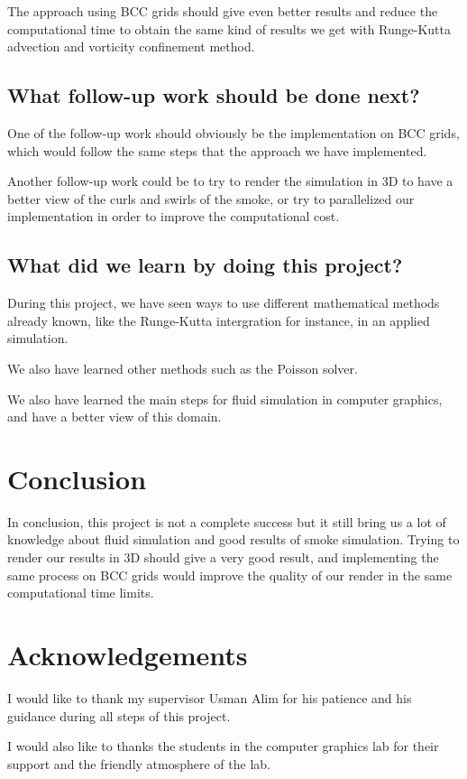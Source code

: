 \documentclass[accepted,single]{gipaper}
\begin{document}
The approach using BCC grids should give even better results and reduce the computational time to obtain the same kind of results we get with Runge-Kutta advection and vorticity confinement method.

\subsection{What follow-up work should be done next?}

One of the follow-up work should obviously be the implementation on BCC grids, which would follow the same steps that the approach we have implemented.

Another follow-up work could be to try to render the simulation in 3D to have a better view of the curls and swirls of the smoke, or try to parallelized our implementation in order to improve the computational cost.

\subsection{What did we learn by doing this project? }

During this project, we have seen ways to use different mathematical methods already known, like the Runge-Kutta intergration for instance, in an applied simulation.

We also have learned other methods such as the Poisson solver.

We also have learned the main steps for fluid simulation in computer graphics, and have a better view of this domain.


\section{Conclusion}

In conclusion, this project is not a complete success but it still bring us a lot of knowledge about fluid simulation and good results of smoke simulation. Trying to render our results in 3D should give a very good result, and implementing the same process on BCC grids would improve the quality of our render in the same computational time limits.


\section*{Acknowledgements}

I would like to thank my supervisor Usman Alim for his patience and his guidance during all steps of this project.

I would also like to thanks the students in the computer graphics lab for their support and the friendly atmosphere of the lab.




\end{document}
